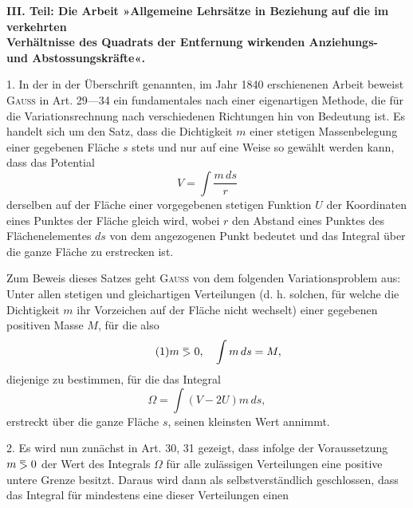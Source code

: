 \clearpage\begingroup\NoSourceHead{}
\renewcommand{\thefootnote}{\arabic{footnote})}\setcounter{footnote}{0}
\newcommand{\BolzaEqualAboveGreater}{\mathrel{\vcenter{\offinterlineskip\hbox{$\scriptstyle=$}\kern-.15ex\hbox{$>$}}}}
\begin{center}\bfseries III. Teil: Die Arbeit »Allgemeine Lehrsätze in Beziehung auf die im verkehrten\\
Verhältnisse des Quadrats der Entfernung wirkenden Anziehungs-\\
und Abstossungskräfte«\footnotemark.\end{center}
\noindent\hspace*{\parindent}1. In der in der Überschrift genannten, im Jahr 1840 erschienenen Arbeit beweist \textsc{Gauss} in Art. 29—34 ein fundamentales  nach einer eigenartigen Methode, die für die Variationsrechnung nach verschiedenen Richtungen hin von Bedeutung ist. Es handelt
sich um den Satz, dass die Dichtigkeit $m$ einer stetigen Massenbelegung einer
gegebenen Fläche $s$ stets und nur auf eine Weise so gewählt werden kann,
dass das Potential
\[
V=\int\frac{m\,ds}{r}
\]
derselben auf der Fläche einer vorgegebenen stetigen Funktion $U$ der Koordinaten eines Punktes der Fläche gleich wird, wobei $r$ den Abstand eines
Punktes des Flächenelementes $ds$ von dem angezogenen Punkt bedeutet und
das Integral über die ganze Fläche zu erstrecken ist.
\par\noindent\hspace*{\parindent}Zum Beweis dieses Satzes geht \textsc{Gauss} von dem folgenden Variationsproblem aus: Unter allen stetigen und gleichartigen Verteilungen (d. h. solchen,
für welche die Dichtigkeit $m$ ihr Vorzeichen auf der Fläche nicht wechselt)
einer gegebenen positiven Masse $M$, für die also
\begin{equation*}\tag{1}
m\BolzaEqualAboveGreater0,\quad\int m\,ds=M,
\end{equation*}
diejenige zu bestimmen, für die das Integral
\[
\Omega=\int(V-2U)m\,ds,
\]
erstreckt über die ganze Fläche $s$, seinen kleinsten Wert annimmt.
\par\noindent\hspace*{\parindent}2. Es wird nun zunächst in Art. 30, 31 gezeigt, dass infolge der Voraussetzung $m\BolzaEqualAboveGreater0$ der Wert des Integrals $\Omega$ für alle zulässigen Verteilungen eine
positive untere Grenze besitzt. Daraus wird dann als selbstverständlich geschlossen, dass das Integral für mindestens eine dieser Verteilungen einen
